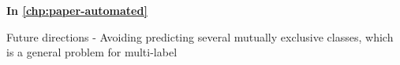 




\vspace{1em}
\textbf{In \cref{chp:paper-automated}} 

Future directions
- Avoiding predicting several mutually exclusive classes, which is a general problem for multi-label 


